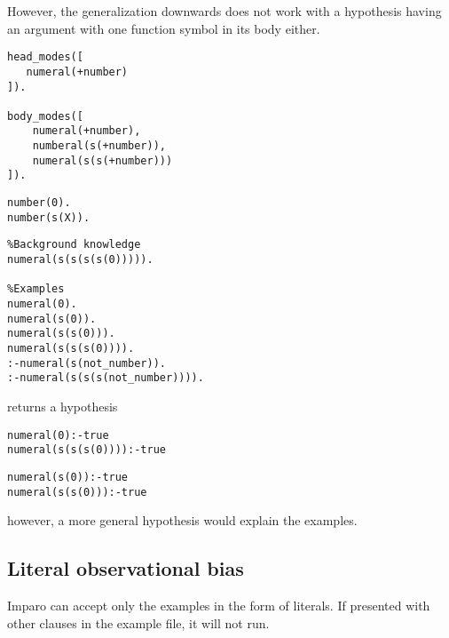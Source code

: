 However, the generalization downwards does not work with a hypothesis having an argument with one function symbol in its body either.

\begin{minipage}[t]{.30\textwidth}
\begin{lstlisting}
head_modes([
   numeral(+number)
]).

body_modes([
    numeral(+number),
    numberal(s(+number)),
    numeral(s(s(+number)))
]).
\end{lstlisting}
\end{minipage}
\begin{minipage}[t]{.20\textwidth}
\begin{lstlisting}
number(0).
number(s(X)).

\end{lstlisting}
\end{minipage}
\begin{minipage}[t]{.30\textwidth}
\begin{lstlisting}
%Background knowledge
numeral(s(s(s(s(0))))).

%Examples
numeral(0).
numeral(s(0)).
numeral(s(s(0))).
numeral(s(s(s(0)))).
:-numeral(s(not_number)).
:-numeral(s(s(s(not_number)))).                                   
\end{lstlisting}
\end{minipage}


returns a hypothesis

\begin{minipage}[t]{.50\textwidth}
\begin{lstlisting}
numeral(0):-true
numeral(s(s(s(0)))):-true
\end{lstlisting}
\end{minipage}
\begin{minipage}[t]{.20\textwidth}
\begin{lstlisting}
numeral(s(0)):-true
numeral(s(s(0))):-true
\end{lstlisting}
\end{minipage}


however, a more general hypothesis  would explain the examples.

\subsection{Literal observational bias}
Imparo can accept only the examples in the form of literals. If presented with other clauses in the example file, it will not run.

